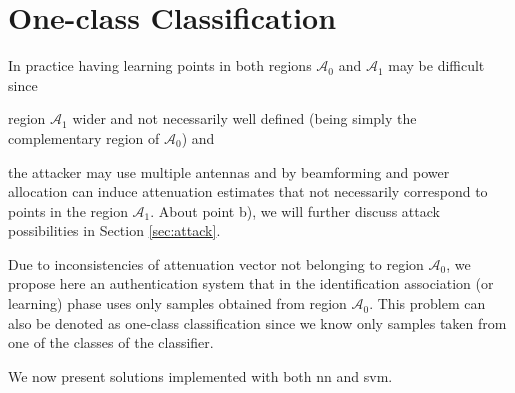 \documentclass[draftcls,onecolumn,12pt]{IEEEtran}
\newcommand{\A}[1]{\mathcal{A}_#1}
\begin{document}

\section{One-class Classification}
\label{sec:OneClass}

In practice having learning points in both regions $\A{0}$ and $\A{1}$ may be difficult since \begin{enumerate*}[label=\alph*)] \item region $\A{1}$ wider and not necessarily well defined (being simply the complementary region of $\A{0}$) and \item the attacker may use multiple antennas and by beamforming and power allocation can induce attenuation estimates that not necessarily correspond to points in the region $\A{1}$. About point b), we will further discuss attack possibilities in Section \ref{sec:attack}.

Due to inconsistencies of attenuation vector not belonging to region $\A{0}$, we propose here an authentication system that in the identification association (or learning) phase uses only samples obtained from region $\A{0}$. This problem can also be denoted as one-class classification since we know only samples taken from one of the classes of the classifier. 

We now present solutions implemented with both \ac{nn} and \ac{svm}.
\end{enumerate*} 
\end{document}
